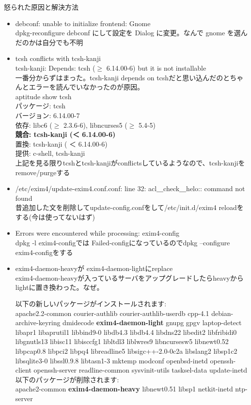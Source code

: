 \documentclass[mingoth,a4paper]{jsarticle}
\begin{document}
怒られた原因と解決方法
\begin{itemize}
\item debconf: unable to initialize frontend: Gnome\\
dpkg-reconfigure debconf にして設定を Dialog に変更。なんで gnome を選ん
      だのかは自分でも不明
\item tcsh conflicts with tcsh-kanji \\
 tcsh-kanji: Depends: tcsh ($\geq $ 6.14.00-6) but it is not installable\\
一番分からずはまった。tcsh-kanji depends on tcshだと思い込んだのとちゃんとエラーを読んでいなかったのが原因。\\
aptitude show tcsh\\
パッケージ: tcsh \\
バージョン: 6.14.00-7 \\
依存: libc6 ($\geq $ 2.3.6-6), libncurses5 ($\geq $ 5.4-5) \\
{\bf 競合: tcsh-kanji (＜ 6.14.00-6)}\\
置換: tcsh-kanji ( ＜ 6.14.00-6) \\
提供: c-shell, tcsh-kanji\\
上記を見る限りtcshとtcsh-kanjiがconflictsしているようなので、tcsh-kanjiをremove/purgeする

\item /etc/exim4/update-exim4.conf.conf: line 32: acl＿check＿helo:: command not found \\
昔追加した文を削除してupdate-config.confをして/etc/init.d/exim4 reloadをする(今は使ってないはず)
\item Errors were encountered while processing: exim4-config\\
dpkg -l exim4-configでは Failed-configになっているのでdpkg --configure exim4-configをする

\item exim4-daemon-heavyが exim4-daemon-lightにreplace\\
exim4-daemon-heavyが入っているサーバをアップグレードしたらheavyからlightに置き換わった。なぜ。

以下の新しいパッケージがインストールされます:\\
  apache2.2-common courier-authlib courier-authlib-userdb cpp-4.1
  debian-archive-keyring dmidecode {\bf exim4-daemon-light} gnupg gpgv
  laptop-detect libapr1 libaprutil1 libbind9-0 libdb4.3 libdb4.4 libdns22
  libedit2 libfribidi0 libgnutls13 libisc11 libisccfg1 libltdl3 liblwres9
  libncursesw5 libnewt0.52 libpcap0.8 libpci2 libpq4 libreadline5
  libsigc++-2.0-0c2a libslang2 libsp1c2 libsqlite3-0 libssl0.9.8 libtasn1-3
  mktemp modconf openbsd-inetd openssh-client openssh-server
  readline-common sysvinit-utils tasksel-data update-inetd\\
以下のパッケージが削除されます:\\
  apache2-common {\bf exim4-daemon-heavy} libnewt0.51 libsp1 netkit-inetd
  ntp-server
\end{itemize}
\end{document}
